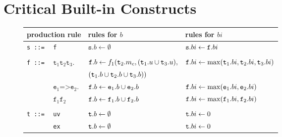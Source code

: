 \section{Critical Built-in Constructs}\label{cbi}
\begin{figure*}
\begin{minipage}{\textwidth}
\begin{center}\scriptsize
\begin{tabular}{llll}
\hline
\multicolumn{2}{l}{production rule}& rules for $b$ & rules for $bi$ \\
  \hline
\texttt{s ::=}&\texttt{f}& $\texttt{s}.b\leftarrow \emptyset$& $\texttt{s}.bi \leftarrow \texttt{f}.bi$\\
       &&\\
\texttt{f ::=}&  $ \texttt{t}_1 \texttt{t}_2 \texttt{t}_3.$
                  &   $\texttt{f}.b \leftarrow f_1( \texttt{t}_2.m_c,  (\texttt{t}_1.u  \cup \texttt{t}_3.u),$%
       &   $ \texttt{f}.bi \leftarrow \max(\texttt{t}_1.bi, \texttt{t}_2.bi, \texttt{t}_3.bi)$                                                       \\
       &&\hspace{2cm}$(\texttt{t}_1.b \cup \texttt{t}_2.b   \cup \texttt{t}_3.b))$&\\
    &  $\texttt{e}_1 \texttt{=>}  \texttt{e}_2.$ & $\texttt{f}.b \leftarrow \texttt{e}_1.b \cup  \texttt{e}_2.b$& $\texttt{f}.bi \leftarrow \max(\texttt{e}_1.bi,  \texttt{e}_2.bi)$\\
    & $ \texttt{f}_1 \texttt{f}_2$ &                $\texttt{f}.b \leftarrow \texttt{f}_1.b\cup\texttt{f}_2.b$ &                $\texttt{f}.bi \leftarrow \max(\texttt{f}_1.bi,\texttt{f}_2.bi)$ \\
&&\\
\texttt{t ::=}& \texttt{uv} 
&                $\texttt{t}.b \leftarrow \emptyset $&                $\texttt{t}.bi \leftarrow 0$ \\
            & \texttt{ex}&               $\texttt{t}.b \leftarrow \emptyset$ &               $\texttt{t}.bi \leftarrow 0$\\

\end{tabular}
\end{center}
\end{minipage}
\end{figure*}
